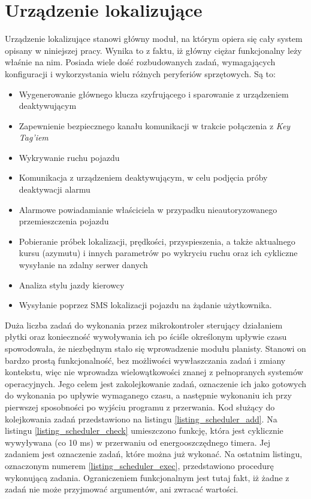 \section{Urządzenie lokalizujące}
\lstset{language=C}

Urządzenie lokalizujące stanowi główny moduł, na którym opiera się cały system opisany w niniejszej pracy. Wynika to z faktu, iż główny ciężar funkcjonalny leży właśnie na nim. Posiada wiele dość rozbudowanych zadań, wymagających konfiguracji i wykorzystania wielu różnych peryferiów sprzętowych. Są to: 

\begin{itemize}
\item Wygenerowanie głównego klucza szyfrującego i sparowanie z urządzeniem deaktywującym
\item Zapewnienie bezpiecznego kanału komunikacji w trakcie połączenia z \textit{Key Tag'iem}
\item Wykrywanie ruchu pojazdu
\item Komunikacja z urządzeniem deaktywującym, w celu podjęcia próby deaktywacji alarmu
\item Alarmowe powiadamianie właściciela w przypadku nieautoryzowanego przemieszczenia pojazdu
\item Pobieranie próbek lokalizacji, prędkości, przyspieszenia, a  także aktualnego kursu (azymutu) i innych parametrów po wykryciu ruchu oraz ich cykliczne wysyłanie na zdalny serwer danych
\item Analiza stylu jazdy kierowcy
\item Wysyłanie poprzez SMS lokalizacji pojazdu na żądanie użytkownika.
\end{itemize}

\clearpage
Duża liczba zadań do wykonania przez mikrokontroler sterujący działaniem płytki oraz konieczność wywoływania ich po ściśle określonym upływie czasu spowodowała, że niezbędnym stało się wprowadzenie modułu planisty. Stanowi on bardzo prostą funkcjonalność, bez możliwości wywłaszczania zadań i zmiany kontekstu, więc nie wprowadza wielowątkowości znanej z pełnopranych systemów operacyjnych. Jego celem jest zakolejkowanie zadań, oznaczenie ich jako gotowych do wykonania po upływie wymaganego czasu, a następnie wykonaniu ich przy pierwszej sposobności po wyjściu programu z przerwania. Kod służący do  kolejkowania zadań przedstawiono na listingu \ref{listing_scheduler_add}. Na listingu \ref{listing_scheduler_check} umieszczono funkcję, która jest cyklicznie wywyływana (co 10 ms) w przerwaniu od energooszczędnego timera. Jej zadaniem jest oznaczenie zadań, które można już wykonać. Na ostatnim listingu, oznaczonym numerem  \ref{listing_scheduler_exec}, przedstawiono procedurę wykonującą zadania. Ograniczeniem funkcjonalnym jest tutaj fakt, iż żadne z zadań nie może przyjmować argumentów, ani zwracać wartości. 
\clearpage

